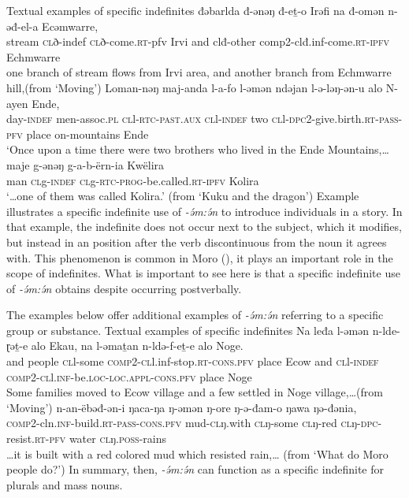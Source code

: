 \ea Textual examples of specific indefinites \label{ex:ch8:speca}
\ea \gll  đǝbarlda đ-ǝnǝŋ đ-eṯ-o Irǝfi na đ-omǝn n-ǝđ-el-a Ecǝmwarre,\\
stream \textsc{cl}ð-indef \textsc{cl}ð-come.\textsc{rt}-pfv Irvi and clđ-other comp2-clđ.inf-come.\textsc{rt}-\textsc{ipfv} Echmwarre\\
\glt one branch of stream flows from Irvi area, and another branch from Echmwarre hill,\hfill  (from `Moving') 
\ex \gll Loman-nǝŋ maj-anda l-a-fo l-ǝmǝn ndǝjan l-ǝ-lǝŋ-ǝn-u alo N-ayen Ende,\\
day-\textsc{indef} men-assoc.\textsc{pl} \textsc{cl}l-\textsc{rtc}-\textsc{past.aux} \textsc{cl}l-\textsc{indef} two \textsc{cl}l-\textsc{dpc}2-give.birth.\textsc{rt}-\textsc{pass}-\textsc{pfv} place on-mountains Ende\\
	\glt `Once upon a time there were two brothers who lived in the Ende Mountains,\ldots \label{ex:ch8:some1}
	\ex \gll maje g-ǝnǝŋ g-a-b-ërn-ia Kwëlira\\
man \textsc{cl}g-\textsc{indef} \textsc{cl}g-\textsc{rtc}-\textsc{prog}-be.called.\textsc{rt}-\textsc{ipfv} Kolira\\
\glt `\ldots one of them was called Kolira.' \hfill (from `Kuku and the dragon')
\z
\z 
Example  illustrates a specific indefinite use of \textit{-ə́m:ə́n} to introduce individuals in a story. In that example, the indefinite does not occur next to the subject, which it modifies, but instead in an position after the verb discontinuous from the noun it agrees with. This phenomenon is common in Moro (), it plays an important role in the scope of indefinites. What is important to see here is that a specific indefinite use of  \textit{-ə́m:ə́n}  obtains despite occurring postverbally. 

 The examples below offer additional examples of \textit{-ə́m:ə́n} referring to a specific group or substance. 
\ea Textual examples of specific indefinites
	\ea 	\gll  Na leđa l-ǝmǝn n-lde-ɽǝṯ-e alo Ekau, na l-ǝmaṯan n-ldǝ-f-eṯ-e alo Noge.\\
					and people \textsc{cl}l-some \textsc{comp}2-\textsc{cl}l.inf-stop.\textsc{rt}-\textsc{cons}.\textsc{pfv} place Ecow and \textsc{cl}l-\textsc{indef} \textsc{comp}2-\textsc{cl}l.\textsc{inf}-be.\textsc{loc}-\textsc{loc}.\textsc{appl}-\textsc{cons}.\textsc{pfv} place Noge\\
			\glt Some families moved to Ecow village and a few settled in Noge village,\ldots \hfill (from `Moving')
	\ex 	\gll n-an-ëbəđ-ən-i ŋaca-ŋa ŋ-əmən ŋ-ore ŋ-ə-đam-o ŋawa ŋə-đənia,\\
			\textsc{comp}2-cln.\textsc{inf}-build.\textsc{rt}-\textsc{pass}-\textsc{cons}.\textsc{pfv} mud-\textsc{cl}ŋ.with \textsc{cl}ŋ-some \textsc{cl}ŋ-red \textsc{cl}ŋ-\textsc{dpc}-resist.\textsc{rt}-\textsc{pfv} water \textsc{cl}ŋ.\textsc{poss}-rains\\
			\glt \ldots it is built with a red colored mud which resisted rain,\ldots  \label{ex:ch8:mud} \hfill (from `What do Moro people do?')
	\z 
\z 
In summary, then, \textit{-ə́m:ə́n} can function as a specific indefinite for plurals and mass nouns.


